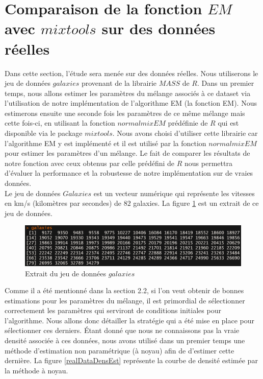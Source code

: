 \documentclass[a4paper,french,10pt]{article}
\begin{document}
\section{Comparaison de la fonction $EM$ avec $mixtools$ sur des données réelles}
Dans cette section, l'étude sera menée sur des données réelles. Nous utiliserons le jeu de données $galaxies$ provenant de la librairie $MASS$ de $R$. Dans un premier temps, nous allons estimer les paramètres du mélange associés à ce dataset via l'utilisation de notre implémentation de l'algorithme EM (la fonction EM). Nous estimerons ensuite une seconde fois les paramètres de ce même mélange mais cette fois-ci, en utilisant la fonction $normalmixEM$ prédéfinie de $R$ qui est disponible via le package $mixtools$. Nous avons choisi d'utiliser cette librairie car l'algorithme EM y est implémenté et il est utilisé par la fonction $normalmixEM$ pour estimer les paramètres d'un mélange. Le fait de comparer les résultats de notre fonction avec ceux obtenus par celle prédéfini de $R$ nous permettra d'évaluer la performance et la robustesse de notre implémentation sur de vraies données.\\
Le jeu de données $Galaxies$ est un vecteur numérique qui représente les vitesses en km/s (kilomètres par secondes) de $82$ galaxies. La figure \ref{galaxies} est un extrait de ce jeu de données.

\begin{figure}[htp] 
	\centering
	\includegraphics[scale=0.45]{images/dataset.png}
	\caption{Extrait du jeu de données $galaxies$}
	\label{galaxies}
\end{figure}

Comme il a été mentionné dans la section 2.2, si l'on veut obtenir de bonnes estimations pour les paramètres du mélange, il est primordial de sélectionner correctement les paramètres qui serviront de conditions initiales pour l'algorithme. Nous allons donc détailler la stratégie qui a été mise en place pour sélectionner ces derniers. Étant donné que nous ne connaissons pas la vraie densité associée à ces données, nous avons utilisé dans un premier temps une méthode d'estimation non paramétrique (à noyau) afin de d'estimer cette dernière. La figure \ref{realDataDensEst} représente la courbe de densité estimée par la méthode à noyau. 
\end{document}
